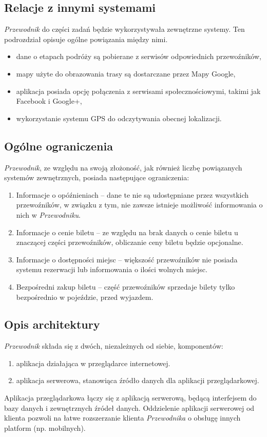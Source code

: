 \documentclass[12pt,a4paper]{report}
\begin{document}
\subsection{Relacje z innymi systemami}
	\emph{Przewodnik} do części zadań będzie wykorzystywała zewnętrzne systemy. Ten podrozdział opisuje ogólne powiązania między nimi.
\begin{itemize}
	\item dane o etapach podróży są pobierane z serwisów odpowiednich przewoźników,
	\item mapy użyte do obrazowania trasy są dostarczane przez Mapy Google,
	\item aplikacja posiada opcję połączenia z serwisami społecznościowymi, takimi jak Facebook i Google+,
	\item wykorzystanie systemu GPS do odczytywania obecnej lokalizacji.
\end{itemize}
\newpage
\subsection{Ogólne ograniczenia}
	\emph{Przewodnik}, ze względu na swoją złożoność, jak również liczbę powiązanych systemów zewnętrznych, posiada następujące ograniczenia:	
\begin{enumerate}
	\item Informacje o opóźnieniach -- dane te nie są udostępniane przez wszystkich przewoźników, w związku z tym, nie zawsze istnieje możliwość informowania o nich w \emph{Przewodniku}.
	\item Informacje o cenie biletu -- ze względu na brak danych o cenie biletu u znaczącej części przewoźników, obliczanie ceny biletu będzie opcjonalne.
	\item Informacje o dostępności miejsc -- większość przewoźników nie posiada systemu rezerwacji lub informowania o ilości wolnych miejsc.
	\item Bezpośredni zakup biletu -- część przewoźników sprzedaje bilety tylko bezpośrednio w pojeździe, przed wyjazdem.
\end{enumerate}
\subsection{Opis architektury}
\emph{Przewodnik} składa się z dwóch, niezależnych od siebie, komponentów:
\begin{enumerate}
	\item aplikacja działająca w przeglądarce internetowej.
	\item aplikacja serwerowa, stanowiąca źródło danych dla aplikacji przeglądarkowej.
\end{enumerate} 
	Aplikacja przeglądarkowa łączy się z aplikacją serwerową, będącą interfejsem do bazy danych i zewnętrznych źródeł danych. Oddzielenie aplikacji serwerowej od klienta pozwoli na łatwe rozszerzanie klienta \emph{Przewodnika} o obsługę innych platform (np. mobilnych).
\end{document}
